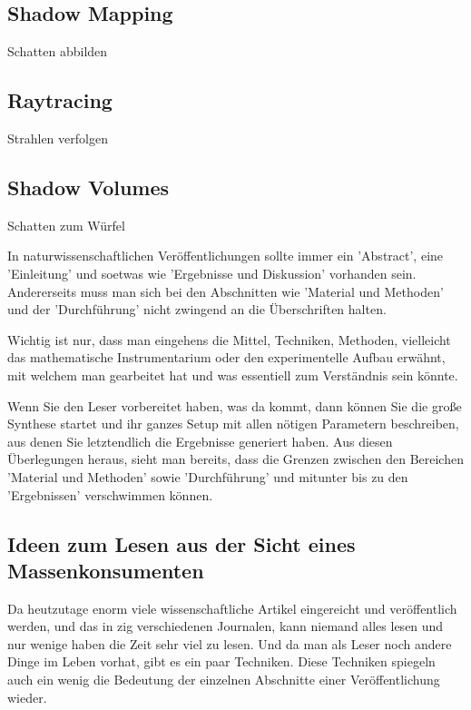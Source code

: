 \documentclass[10pt,twocolumn]{scrartcl}
\begin{document}
\subsection{Shadow Mapping}

Schatten abbilden

\subsection{Raytracing}

Strahlen verfolgen

\subsection{Shadow Volumes}

Schatten zum Würfel

In naturwissenschaftlichen Veröffentlichungen sollte immer 
ein 'Abstract', eine 'Einleitung' und soetwas wie 'Ergebnisse und
Diskussion' vorhanden sein. Andererseits muss man sich bei den
Abschnitten wie 'Material und Methoden' und der 'Durchführung'
nicht zwingend an die Überschriften halten. 

Wichtig ist nur, dass man eingehens die Mittel, Techniken,
Methoden, vielleicht das mathematische Instrumentarium 
oder den experimentelle Aufbau erwähnt, mit welchem man 
gearbeitet hat und was essentiell zum Verständnis sein könnte.

Wenn Sie den Leser vorbereitet haben, was da kommt, dann können
Sie die große Synthese startet und ihr ganzes Setup mit allen
nötigen Parametern beschreiben, aus denen Sie letztendlich
die Ergebnisse generiert haben. Aus diesen Überlegungen heraus, 
sieht man bereits, dass die Grenzen zwischen den Bereichen 
'Material und Methoden' sowie 'Durchführung' und mitunter 
bis zu den 'Ergebnissen' verschwimmen können.

\subsection*{Ideen zum Lesen aus der Sicht eines Massenkonsumenten}

Da heutzutage enorm viele wissenschaftliche Artikel
eingereicht und veröffentlich werden, und das in zig verschiedenen
Journalen, kann niemand alles lesen und nur wenige haben die Zeit 
sehr viel zu lesen. Und da man als Leser noch andere Dinge im Leben 
vorhat, gibt es ein paar Techniken.
Diese Techniken spiegeln auch ein wenig die Bedeutung der einzelnen 
Abschnitte einer Veröffentlichung wieder.
\end{document}

